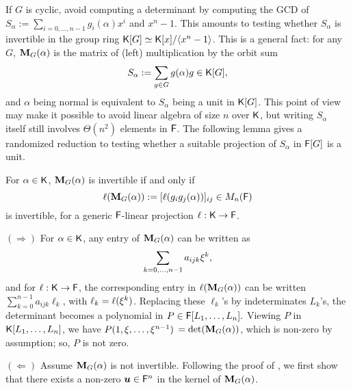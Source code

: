 If $G$ is cyclic, \cite{GatGie90} avoid computing a determinant by
computing the GCD of $S_\alpha := \sum_{i = 0,\dots,n-1} g_i(\alpha)x^i$
and $x^n-1$. This amounts to testing whether $S_\alpha$ is
invertible in the group ring ${\mathsf{K}}[G]\simeq{\mathsf{K}}[x]/\langle x^n-1\rangle$. This is a general fact: for any $G$,
$\mat M_G(\alpha)$ is the matrix of (left) multiplication by the orbit
sum
$$S_\alpha:= \sum_{g \in G} g(\alpha)g \in {\mathsf{K}}[G],$$ and $\alpha$ being
normal is equivalent to $S_\alpha$ being a unit in ${\mathsf{K}}[G]$. This point of
view may make it possible to avoid linear algebra of size $n$ over ${\mathsf{K}}$,
but writing $S_\alpha$ itself still involves $\Theta(n^2)$ elements in
${\mathsf{F}}$. The following lemma
gives a randomized reduction to testing whether a suitable projection of
$S_\alpha$ in ${\mathsf{F}}[G]$ is a unit.
 


\begin{lemma}
  \label{Lem:Proj}
  For $\alpha \in {\mathsf{K}}$, $\mat M_G(\alpha)$ is invertible if and only
  if $$\ell(\mat M_G(\alpha)) := [\ell(g_ig_j(\alpha))]_{ij} \in M_n(\F)$$
  is invertible, for a generic ${\mathsf{F}}$-linear projection $\ell: {\mathsf{K}} \to {\mathsf{F}}$.
\end{lemma}
  $(\Rightarrow)$ For  $\alpha\in{\mathsf{K}}$, any entry of
  $\mat M_G(\alpha)$ can be written as
  \begin{equation}\label{Eq:PrimElm}
    \sum_{k= 0,\dots,n-1} a_{ijk}\xi^k,
  \end{equation}
  and for $\ell: {\mathsf{K}} \to {\mathsf{F}}$, the corresponding entry in $\ell(\mat
  M_G(\alpha))$ can be written $\sum_{k= 0}^{n-1} a_{ijk}\ell_k$, with
  $\ell_k = \ell(\xi^k)$. Replacing these $\ell_k$'s by
  indeterminates $L_k$'s, the determinant becomes a polynomial in $P
  \in {\mathsf{F}}[L_1, \ldots, L_n].$ Viewing $P$ in ${\mathsf{K}}[L_1, \ldots, L_n]$, we
  have $ P(1, \xi, \ldots, \xi^{n-1})$ $= \det(\mat M_G(\alpha))$,
  which is non-zero by assumption; so, $P$ is not zero.
  
  $(\Leftarrow)$ Assume $\mat M_G(\alpha)$ is not invertible. Following the
  proof of \cite[Lemma 4]{Jam18}, we first show that there exists a
  non-zero $\boldsymbol{u} \in {\mathsf{F}}^n$ in the kernel of $\mat M_G(\alpha)$.
  
